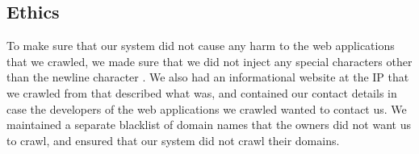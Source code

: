 \subsection{Ethics}

To make sure that our system did not cause any harm to the web applications that we crawled, we made sure that we did not inject any special characters other than the newline character%
. We also had an informational website at the IP that we crawled from that described what \ehi was, and contained our contact details in case the developers of the web applications we crawled wanted to contact us. We maintained a separate blacklist of domain names that the owners did not want us to crawl, and ensured that our system did not crawl their domains.
